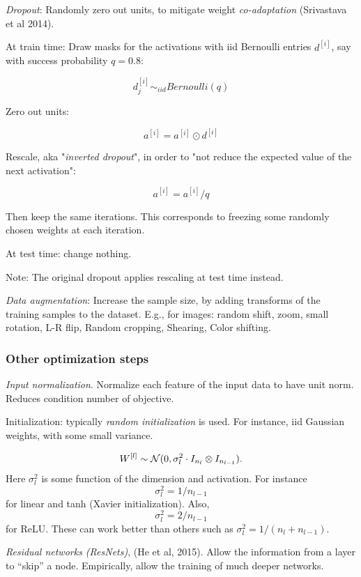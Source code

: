 \documentclass[english]{article}
\begin{document}
\item 
\emph{Dropout}: Randomly zero out units, to mitigate weight \emph{co-adaptation} (Srivastava et al 2014). 

At train time:  Draw masks for the activations with iid Bernoulli entries  $d^{[i]}$, say with success probability $q=0.8$: 

$$ d^{[i]}_j \sim_{iid} Bernoulli(q)$$

Zero out units:

$$a^{[i]} = a^{[i]}\odot d^{[i]}$$

Rescale, aka "\emph{inverted dropout}", in order to "not reduce the expected value of the next activation": 

$$a^{[i]} = a^{[i]}/q$$


Then keep the same iterations. This corresponds to freezing some randomly chosen weights at each iteration.

At test time: change nothing. 

Note: The original dropout applies rescaling at test time instead. 

\item 
\emph{Data augmentation}: Increase the sample size, by adding transforms of the training samples to the dataset. E.g., for images: random shift, zoom, small rotation, L-R flip, Random cropping, Shearing, Color shifting. 
\eenum 

\subsubsection{Other optimization steps}


\benum
\item \emph{Input normalization}. Normalize each feature of the input data to have unit norm. Reduces condition number of objective. 

\item 
Initialization: typically \emph{random initialization} is used. For instance, iid Gaussian weights, with some small variance. 

$$W^{[l]} \sim \mathcal{N}(0, \sigma^2_l \cdot I_{n_l}\otimes I_{n_{l-1}}).$$
 Here $\sigma^2_l$ is some function of the dimension and activation. For instance $$\sigma^2_l = 1/n_{l-1}$$ for linear and tanh (Xavier initialization). Also, $$\sigma^2_l = 2/n_{l-1}$$ for ReLU. These can work better than others such as $\sigma^2_l = 1/(n_l+n_{l-1})$.

\item \emph{Residual networks (ResNets)}, (He et al, 2015). Allow the information from a layer to ``skip'' a node.  Empirically, allow the training of much deeper networks. 
\end{document}
